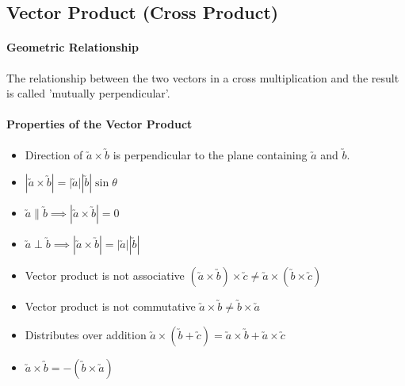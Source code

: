\documentclass[a4paper,twoside,10pt]{article}
\begin{document}
		\subsection{Vector Product (Cross Product)}
			\paragraph{Geometric Relationship} The relationship between the two vectors in a cross multiplication and the result is called 'mutually perpendicular'.
			\paragraph{Properties of the Vector Product}
				\begin{itemize}
					\item Direction of $\utilde{a}\times\utilde{b}$ is perpendicular to the plane containing $\utilde{a}$ and $\utilde{b}$.
					\item $|\utilde{a}\times\utilde{b}|=|\utilde{a}||\utilde{b}|\sin\theta$
					\item $\utilde{a}\parallel\utilde{b}\implies|\utilde{a}\times\utilde{b}|=0$
					\item $\utilde{a}\perp\utilde{b}\implies|\utilde{a}\times\utilde{b}|=|\utilde{a}||\utilde{b}|$
					\item Vector product is not associative $\left(\utilde{a}\times\utilde{b}\right)\times\utilde{c}\neq\utilde{a}\times\left(\utilde{b}\times\utilde{c}\right)$
					\item Vector product is not commutative $\utilde{a}\times\utilde{b}\neq\utilde{b}\times\utilde{a}$
					\item Distributes over addition $\utilde{a}\times\left(\utilde{b}+\utilde{c}\right)=\utilde{a}\times\utilde{b}+\utilde{a}\times\utilde{c}$
					\item $\utilde{a}\times\utilde{b}=-\left(\utilde{b}\times\utilde{a}\right)$
				\end{itemize}
			
\end{document}

